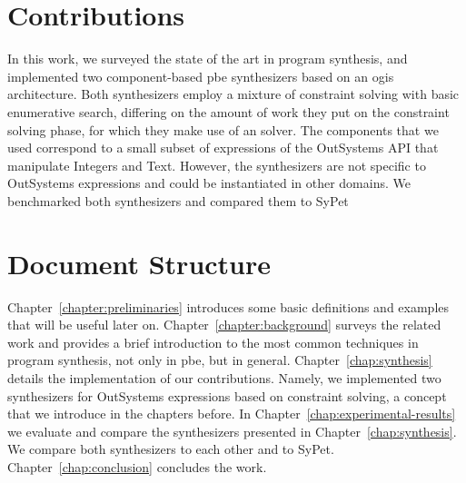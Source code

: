 \section{Contributions}

In this work, we surveyed the state of the art in program synthesis, and
implemented two component-based \gls{pbe} synthesizers based on an \gls{ogis}
architecture.
Both synthesizers employ a mixture of constraint solving with basic enumerative
search, differing on the amount of work they put on the constraint solving
phase, for which they make use of an  solver.
The components that we used correspond to a small subset of expressions of the
OutSystems API that manipulate Integers and Text.
However, the synthesizers are not specific to OutSystems expressions and could
be instantiated in other domains.
We benchmarked both synthesizers and compared them to SyPet~\cite{Feng:2017:CSC}

\section{Document Structure}
\label{sec:structure}

Chapter~\ref{chapter:preliminaries} introduces some basic definitions and examples
that will be useful later on.
Chapter~\ref{chapter:background} surveys the related work and provides a brief
introduction to the most common techniques in program synthesis, not only in
\gls{pbe}, but in general.
Chapter~\ref{chap:synthesis} details the implementation of our contributions.
Namely, we implemented two synthesizers for OutSystems expressions based on
constraint solving, a concept that we introduce in the chapters before.
In Chapter~\ref{chap:experimental-results} we evaluate and compare the
synthesizers presented in Chapter~\ref{chap:synthesis}.
We compare both synthesizers to each other and to SyPet.
Chapter~\ref{chap:conclusion} concludes the work.